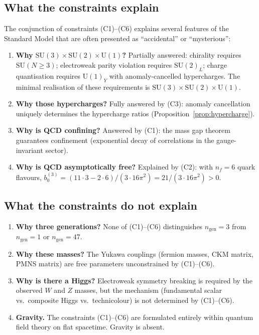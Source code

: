 \documentclass[12pt]{article}
\theoremstyle{definition}
\theoremstyle{remark}
\newcommand{\SU}{\mathrm{SU}}
\newcommand{\UU}{\mathrm{U}}
\begin{document}
\subsection{What the constraints explain}

The conjunction of constraints (C1)--(C6) explains several
features of the Standard Model that are often presented as
``accidental'' or ``mysterious'':

\begin{enumerate}
\item \textbf{Why $\SU(3) \times \SU(2) \times \UU(1)$?}
  Partially answered: chirality requires $\SU(N \geq 3)$;
  electroweak parity violation requires $\SU(2)_L$;
  charge quantisation requires $\UU(1)_Y$ with anomaly-cancelled
  hypercharges.  The minimal realisation of these requirements
  is $\SU(3) \times \SU(2) \times \UU(1)$.

\item \textbf{Why those hypercharges?}
  Fully answered by (C3): anomaly cancellation uniquely
  determines the hypercharge ratios
  (Proposition~\ref{prop:hypercharge}).

\item \textbf{Why is QCD confining?}
  Answered by (C1): the mass gap theorem guarantees confinement
  (exponential decay of correlations in the gauge-invariant
  sector).

\item \textbf{Why is QCD asymptotically free?}
  Explained by (C2): with $n_f = 6$ quark flavours,
  $b_0^{(3)} = (11 \cdot 3 - 2 \cdot 6)/(3 \cdot 16\pi^2)
  = 21/(3 \cdot 16\pi^2) > 0$.
\end{enumerate}

\subsection{What the constraints do not explain}

\begin{enumerate}
\item \textbf{Why three generations?}
  None of (C1)--(C6) distinguishes $n_{\mathrm{gen}} = 3$ from
  $n_{\mathrm{gen}} = 1$ or $n_{\mathrm{gen}} = 47$.

\item \textbf{Why these masses?}
  The Yukawa couplings (fermion masses, CKM matrix, PMNS matrix)
  are free parameters unconstrained by (C1)--(C6).

\item \textbf{Why is there a Higgs?}
  Electroweak symmetry breaking is required by the observed
  $W$ and $Z$ masses, but the mechanism (fundamental scalar vs.\
  composite Higgs vs.\ technicolour) is not determined by
  (C1)--(C6).

\item \textbf{Gravity.}
  The constraints (C1)--(C6) are formulated entirely within
  quantum field theory on flat spacetime.  Gravity is absent.
\end{enumerate}
\end{document}
